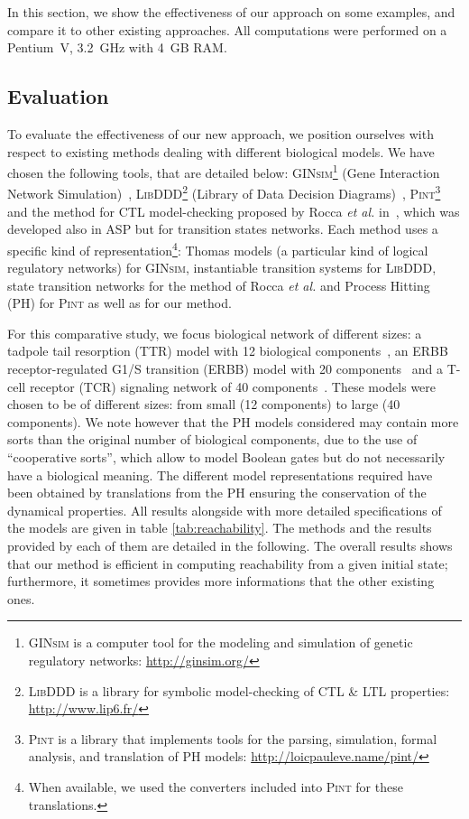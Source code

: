 In this section, we show the effectiveness of our approach on some examples,
and compare it to other existing approaches.
All computations were performed on a Pentium~V, 3.2~GHz with 4~GB RAM.

\subsection{Evaluation}
To evaluate the effectiveness of our new approach,
we position ourselves with respect to existing methods dealing with different biological models.
We have chosen the following tools, that are detailed below: 
\textsc{GINsim}\footnote{\textsc{GINsim} is a computer tool for the modeling and simulation of genetic regulatory networks: \url{http://ginsim.org/}} (Gene Interaction Network Simulation)~\cite{gonzalez2006ginsim,naldi2009logical,naldi2007decision},
\textsc{LibDDD}\footnote{\textsc{LibDDD} is a library for symbolic model-checking of CTL \& LTL properties: \url{http://www.lip6.fr/}}
(Library of Data Decision Diagrams)~\cite{thierry2009hierarchical,colange2013towards},
\textsc{Pint}\footnote{\textsc{Pint} is a library that implements tools for the parsing, simulation, formal analysis, and translation of PH models: \url{http://loicpauleve.name/pint/}}~\cite{PMR12-MSCS}
and the method for CTL model-checking proposed by Rocca \textit{et al.} in~\cite{roccaasp},
which was developed also in ASP but for transition states networks.
Each method uses a specific kind of representation\footnote{When available, we used the converters included into \textsc{Pint} for these translations.}:
Thomas models (a particular kind of logical regulatory networks) for \textsc{GINsim},
instantiable transition systems for \textsc{LibDDD},
state transition networks for the method of Rocca \textit{et al.}
and Process Hitting (PH) for \textsc{Pint} as well as for our method.

For this comparative study, we focus biological network of different sizes:
a tadpole tail resorption (TTR) model with 12 biological components~\cite{khalis2009smbionet},
an ERBB receptor-regulated G1/S transition (ERBB) model with 20 components~\cite{Samaga2009}
and a T-cell receptor (TCR) signaling network of 40 components~\cite{Klamt06}.
These models were chosen to be of different sizes:
from small (12 components) to large (40 components).
We note however that the PH models considered may contain more sorts than
the original number of biological components, due to the use of
“cooperative sorts”, which allow to model Boolean gates but do not necessarily
have a biological meaning.
The different model representations required have been obtained by translations
from the PH
ensuring the conservation of the dynamical properties.
All results alongside with more detailed specifications of the models
are given in table \ref{tab:reachability}.
The methods and the results provided by each of them are detailed in the following.
The overall results shows that our method is efficient in computing reachability
from a given initial state;
furthermore, it sometimes provides more informations that the other existing ones.

